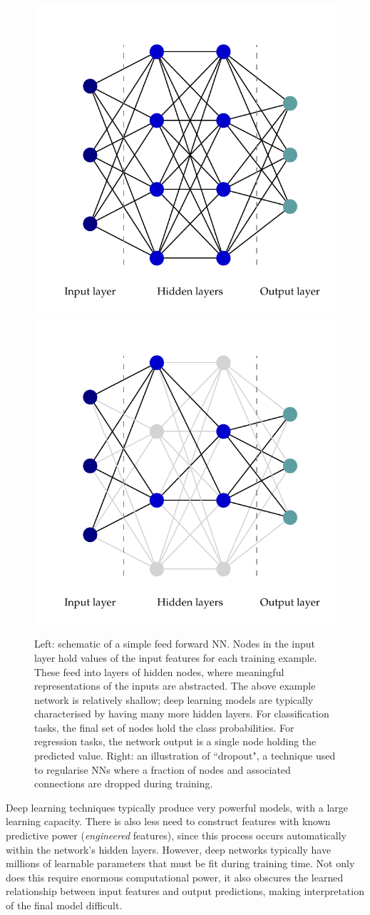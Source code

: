 \begin{figure}[htbp!] 
\centering 
\includegraphics[width =0.46\linewidth]{Figures/ML/NNExample.pdf} \hfill
\includegraphics[width =0.46\linewidth]{Figures/ML/NNExample_dropout.pdf}
\caption[A typical neural network with dropout regularisation.]{Left: schematic of a simple feed forward NN. Nodes in the input layer hold values of the input features for each training example. These feed into layers of hidden nodes, where meaningful representations of the inputs are abstracted. The above example network is relatively shallow; deep learning models are typically characterised by having many more hidden layers. For classification tasks, the final set of nodes hold the class probabilities. For regression tasks, the network output is a single node holding the predicted value. Right: an illustration of ``dropout", a technique used to regularise NNs where a fraction of nodes and associated connections are dropped during training.}
\label{fig:hee_dnn_plus_dropout}
\end{figure}

Deep learning techniques typically produce very powerful models, with a large learning capacity. There is also less need to construct features with known predictive power (\emph{engineered} features), since this process occurs automatically within the network's hidden layers. However, deep networks typically have millions of learnable parameters that must be fit during training time. Not only does this require enormous computational power, it also obscures the learned relationship between input features and output predictions, making interpretation of the final model difficult. 

